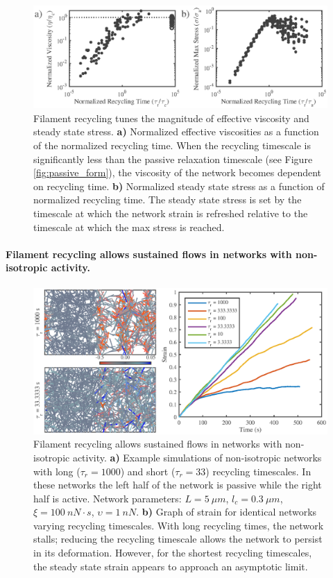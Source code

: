 \documentclass[10pt,letterpaper]{article}
\begin{document}
\begin{figure}[h!]
\centering
\includegraphics[width=\hsize]{figures/figure5S}
\caption{\label{fig:rec_form}  Filament recycling tunes the magnitude of effective viscosity and steady state stress. \textbf{a)}  Normalized effective viscosities as a function of the normalized recycling time. When the recycling timescale is significantly less than the passive relaxation timescale (see Figure \ref{fig:passive_form}), the viscosity of the network becomes dependent on recycling time.  \textbf{b)} Normalized steady state stress as a function of normalized recycling time.  The steady state stress is set by the timescale at which the network strain is refreshed relative to the timescale at which the max stress is reached. }
\end{figure}


\paragraph{Filament recycling allows sustained flows in networks with non-isotropic activity.}



\begin{figure}[h!]
\centering
\includegraphics[width=\hsize]{figures/figure6a}
\caption{\label{fig:flow_ex}  Filament recycling allows sustained flows in networks with non-isotropic activity. \textbf{a)} Example simulations of non-isotropic networks with long ($\tau_r=1000$) and short ($\tau_r=33$) recycling timescales. In these networks the left half of the network is passive while the right half is active.  Network parameters: $L=5\: \mu m$, $l_c=0.3\: \mu m$, $\xi=100\: nN\cdot s$, $\upsilon=1\: nN$. \textbf{b)} Graph of strain for identical networks varying recycling timescales.  With long recycling times, the network stalls; reducing the recycling timescale allows the network to persist in its deformation.  However, for the shortest recycling timescales, the steady state strain appears to approach an asymptotic limit. }
\end{figure}
\end{document}
